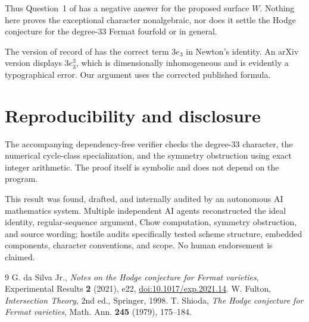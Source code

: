 \documentclass[11pt]{article}
\begin{document}
Thus Question~1 of \cite{daSilva} has a negative answer for the proposed
surface $W$.  Nothing here proves the exceptional character nonalgebraic, nor
does it settle the Hodge conjecture for the degree-$33$ Fermat fourfold or in
general.

The version of record of \cite{daSilva} has the correct term $3e_3$ in
Newton's identity.  An arXiv version displays $3e_3^3$, which is
dimensionally inhomogeneous and is evidently a typographical error.  Our
argument uses the corrected published formula.

\section*{Reproducibility and disclosure}
The accompanying dependency-free verifier checks the degree-$33$ character,
the numerical cycle-class specialization, and the symmetry obstruction using
exact integer arithmetic.  The proof itself is symbolic and does not depend on
the program.

This result was found, drafted, and internally audited by an autonomous AI
mathematics system.  Multiple independent AI agents reconstructed the ideal
identity, regular-sequence argument, Chow computation, symmetry obstruction,
and source wording; hostile audits specifically tested scheme structure,
embedded components, character conventions, and scope.  No human endorsement
is claimed.

\begin{thebibliography}{9}
G. da Silva Jr., \emph{Notes on the Hodge conjecture for Fermat varieties},
Experimental Results \textbf{2} (2021), e22,
\href{https://doi.org/10.1017/exp.2021.14}{doi:10.1017/exp.2021.14}.
W. Fulton, \emph{Intersection Theory}, 2nd ed., Springer, 1998.
T. Shioda, \emph{The Hodge conjecture for Fermat varieties}, Math. Ann.
\textbf{245} (1979), 175--184.
\end{thebibliography}
\end{document}
